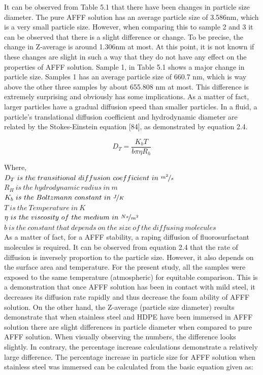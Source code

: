 \documentclass[12pt]{report}
\begin{document}
It can be observed from Table 5.1 that there have been changes in particle size diameter. The pure AFFF solution has an average particle size of 3.586nm, which is a very small particle size. However, when comparing this to sample 2 and 3 it can be observed that there is a slight difference or change. To be precise, the change in Z-average is around 1.306nm at most. At this point, it is not known if these changes are slight in such a way that they do not have any effect on the properties of AFFF solution. Sample 1, in Table 5.1 shows a major change in particle size. Samples 1 has an average particle size of 660.7 nm, which is way above the other three samples by about 655.808 nm at most. This difference is extremely surprising and obviously has some implications. As a matter of fact, larger particles have a gradual diffusion speed than smaller particles. In a fluid, a particle's translational diffusion coefficient and hydrodynamic diameter are related by the Stokes-Einstein equation [84], as demonstrated by equation 2.4.

\begin{equation}
    D_T=\frac{K_bT}{b\pi \eta R_h}
\end{equation}

\noindent Where, \\
$D_T\ is\ the\ transitional\ diffusion\ coefficient\ in\ \nicefrac{m^2}{s}$ \\
$R_H\ is\ the\ hydrodynamic\ radius\ in\ m$ \\
$K_b\ is\ the\ Boltzmann\ constant\ in\ \nicefrac{J}{K}$ \\
$T\ is\ the\ Temperature\ in\ K$ \\
$\eta\ is\ the\ viscosity\ of\ the\ medium\ in\ \nicefrac{Ns}{m^2}$ \\
$b\ is\ the\ constant\ that\ depends\ on\ the\ size\ of\ the\ diffusing\ molecules$ \\

As a matter of fact, for a AFFF stability, a raping diffusion of fluorosurfactant molecules is required. It can be observed from equation 2.4 that the rate of diffusion is inversely proportion to the particle size. However, it also depends on the surface area and temperature. For the present study, all the samples were exposed to the same temperature (atmospheric) for equitable comparison. This is a demonstration that once AFFF solution has been in contact with mild steel, it decreases its diffusion rate rapidly and thus decrease the foam ability of AFFF solution.  On the other hand, the Z-average (particle size diameter) results demonstrate that when stainless steel and HDPE have been immersed in AFFF solution there are slight differences in particle diameter when compared to pure AFFF solution. When visually observing the numbers, the difference looks slightly. In contrary, the percentage increase calculations demonstrate a relatively large difference. The percentage increase in particle size for AFFF solution when stainless steel was immersed can be calculated from the basic equation given as: 
\end{document}
